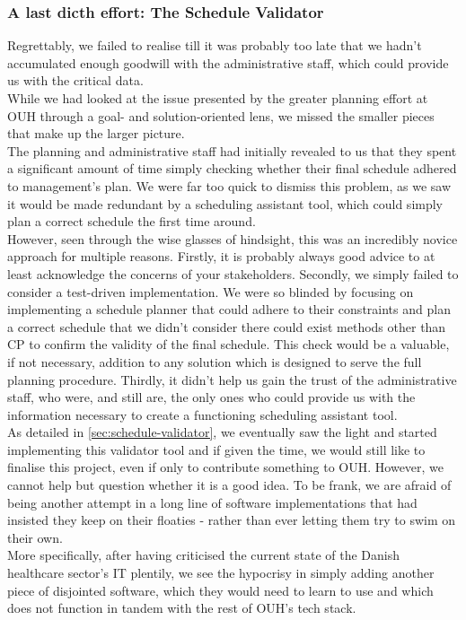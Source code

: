 \subsubsection*{A last dicth effort: The Schedule Validator}
Regrettably, we failed to realise till it was probably too late that we hadn't accumulated enough goodwill with the administrative staff, which could provide us with the critical data. 
\\
While we had looked at the issue presented by the greater planning effort at OUH through a goal- and solution-oriented lens, we missed the smaller pieces that make up the larger picture.
\\
The planning and administrative staff had initially revealed to us that they spent a significant amount of time simply checking whether their final schedule adhered to management's plan. We were far too quick to dismiss this problem, as we saw it would be made redundant by a scheduling assistant tool, which could simply plan a correct schedule the first time around.
\\
However, seen through the wise glasses of hindsight, this was an incredibly novice approach for multiple reasons. Firstly, it is probably always good advice to at least acknowledge the concerns of your stakeholders. Secondly, we simply failed to consider a test-driven implementation. We were so blinded by focusing on implementing a schedule planner that could adhere to their constraints and plan a correct schedule that we didn't consider there could exist methods other than CP to confirm the validity of the final schedule. This check would be a valuable, if not necessary, addition to any solution which is designed to serve the full planning procedure. Thirdly, it didn't help us gain the trust of the administrative staff, who were, and still are, the only ones who could provide us with the information necessary to create a functioning scheduling assistant tool. 
\\
As detailed in \autoref{sec:schedule-validator}, we eventually saw the light and started implementing this validator tool and if given the time, we would still like to finalise this project, even if only to contribute something to OUH. However, we cannot help but question whether it is a good idea. To be frank, we are afraid of being another attempt in a long line of software implementations that had insisted they keep on their floaties - rather than ever letting them try to swim on their own.
\\
More specifically, after having criticised the current state of the Danish healthcare sector's IT plentily, we see the hypocrisy in simply adding another piece of disjointed software, which they would need to learn to use and which does not function in tandem with the rest of OUH's tech stack.

